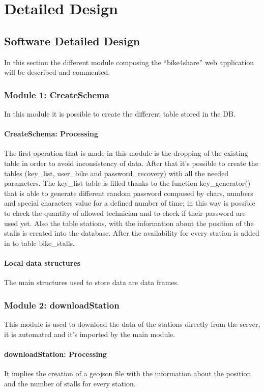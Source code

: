 \documentclass{article}
\begin{document}
\section{Detailed Design}
\subsection{Software Detailed Design}
In this section the different module composing the “bike4share” web application will be described and commented.

\subsubsection{Module 1: CreateSchema}
In this module it is possible to create the different table stored in the DB.
\paragraph{CreateSchema: Processing}
The first operation that is made in this module is the dropping of the existing table in order to avoid inconsistency of data. After that it’s possible to create the tables (key\_list, user\_bike and password\_recovery) with all the needed parameters.
The key\_list table is filled thanks to the function key\_generator() that is able to generate different random password composed by chars, numbers and special characters value for a defined number of time; in this way is possible to check the quantity of allowed technician and to check if their password are used yet.
Also the table stations, with the information about the position of the stalls is created into the database. After the availability for every station is added in to table bike\_stalls. 

\paragraph{Local data structures}
The main structures used to store data are data frames.

\subsubsection{Module 2: downloadStation}
This module is used to download the data of the stations directly from the server, it is automated and it’s imported by the main module.

\paragraph{downloadStation: Processing}
It implies the creation of a geojson file with the information about the position and the number of stalls for every station.
\end{document}
